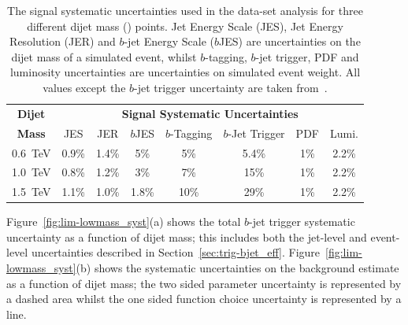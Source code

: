 \begin{table}[!htb]
  \centering
  \begin{tabular}{|c||c|c|c|c|c|c|c|}
    \hline
    \textbf{Dijet}   & \multicolumn{7}{c|}{\textbf{Signal Systematic Uncertainties}}                    \\ \cline{2-8} 
    \textbf{Mass}    & JES   & JER   & $b$JES  & $b$-Tagging & $b$-Jet Trigger & PDF & Lumi.        \\
    \hline                                                                        
    0.6~TeV          & 0.9\% & 1.4\% & 5\%     &     5\%     &      5.4\%   & 1\% & 2.2\%       \\
    1.0~TeV          & 0.8\% & 1.2\% & 3\%     &     7\%     &       15\%   & 1\% & 2.2\%       \\
    1.5~TeV          & 1.1\% & 1.0\% & 1.8\%    &    10\%     &       29\%   & 1\% & 2.2\%       \\
    \hline
  \end{tabular}
  \caption[The signal systematic uncertainties used in the \lm{} data-set analysis.]
          {The signal systematic uncertainties used in the \lm{} data-set analysis
           for three different dijet mass (\mjj{}) points.
          Jet Energy Scale (JES), Jet Energy Resolution (JER) and $b$-jet Energy Scale ($b$JES)
          are uncertainties on the dijet mass of a simulated event,
          whilst $b$-tagging, $b$-jet trigger, PDF and luminosity uncertainties are uncertainties on simulated event weight.
          All values except the $b$-jet trigger uncertainty are taken from~\cite{dibjet-full}.}
  \label{tab:lim-lowmass_syst}
  \end{table}

\newpage
Figure~\ref{fig:lim-lowmass_syst}(a) shows the total $b$-jet trigger systematic uncertainty as a function of dijet  mass;
this includes both the jet-level and event-level uncertainties described in Section~\ref{sec:trig-bjet_eff}.
Figure~\ref{fig:lim-lowmass_syst}(b) shows the systematic uncertainties on the background estimate as a function of dijet mass;
the two sided parameter uncertainty is represented by a dashed area
whilst the one sided function choice uncertainty is represented by a line.

